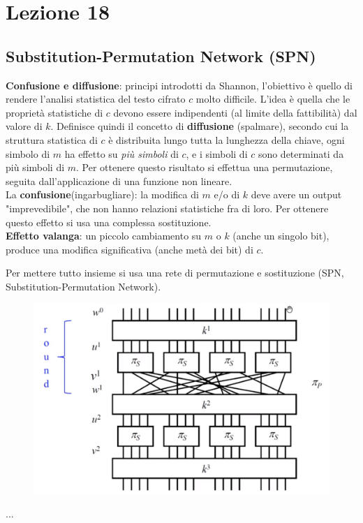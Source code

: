 \section*{Lezione 18}

\subsection*{Substitution-Permutation Network (SPN)}
\textbf{Confusione e diffusione}: principi introdotti da Shannon, l'obiettivo è quello di rendere l'analisi statistica del testo cifrato $c$ molto difficile. L'idea è quella che le proprietà statistiche di $c$ devono essere indipendenti (al limite della fattibilità) dal valore di $k$. Definisce quindi il concetto di \textbf{diffusione} (spalmare), secondo cui la struttura statistica di $c$ è distribuita lungo tutta la lunghezza della chiave, ogni simbolo di $m$ ha effetto su \textit{più simboli} di $c$, e i simboli di $c$ sono determinati da più simboli di $m$. Per ottenere questo risultato si effettua una permutazione, seguita dall'applicazione di una funzione non lineare.\\
La \textbf{confusione}(ingarbugliare): la modifica di $m$ e/o di $k$ deve avere un output "imprevedibile", che non hanno relazioni statistiche fra di loro. Per ottenere questo effetto si usa una complessa sostituzione.\\
\textbf{Effetto valanga}: un piccolo cambiamento su $m$ o $k$ (anche un singolo bit), produce una modifica significativa (anche metà dei bit) di $c$.

Per mettere tutto insieme si usa una rete di permutazione e sostituzione (SPN, Substitution-Permutation Network).

\begin{figure}[h]
	\centering
	\includegraphics[width=0.85\linewidth]{immagini/img43}
\end{figure}
...

